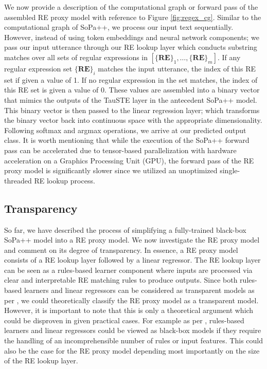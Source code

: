 We now provide a description of the computational graph or forward pass of the
assembled RE proxy model with reference to Figure \ref{fig:regex_cg}. Similar to
the computational graph of SoPa++, we process our input text sequentially.
However, instead of using token embeddings and neural network components; we
pass our input utterance through our RE lookup layer which conducts substring
matches over all sets of regular expressions in $[\{\textbf{RE}\}_1, \ldots,
\{\textbf{RE}\}_m]$. If any regular expression set $\{\textbf{RE}\}_i$ matches
the input utterance, the index of this RE set if given a value of 1. If no
regular expression in the set matches, the index of this RE set is given a value
of 0. These values are assembled into a binary vector that mimics the outputs of
the TauSTE layer in the antecedent SoPa++ model. This binary vector is then
passed to the linear regression layer; which transforms the binary vector back
into continuous space with the appropriate dimensionality. Following softmax and
argmax operations, we arrive at our predicted output class. It is worth
mentioning that while the execution of the SoPa++ forward pass can be
accelerated due to tensor-based parallelization with hardware acceleration on a
Graphics Processing Unit (GPU), the forward pass of the RE proxy model is
significantly slower since we utilized an unoptimized single-threaded RE lookup
process.

\subsection{Transparency}

\label{section:re_transparency}

So far, we have described the process of simplifying a fully-trained black-box
SoPa++ model into a RE proxy model. We now investigate the RE proxy model and
comment on its degree of transparency. In essence, a RE proxy model consists of
a RE lookup layer followed by a linear regressor. The RE lookup layer can be
seen as a rules-based learner component where inputs are processed via clear and
interpretable RE matching rules to produce outputs. Since both rules-based
learners and linear regressors can be considered as transparent models as per
\citet[Page 7, Section 3]{arrieta2020explainable}, we could theoretically
classify the RE proxy model as a transparent model. However, it is important to
note that this is only a theoretical argument which could be disproven in given
practical cases. For example as per \citet[Page 9, Table
2]{arrieta2020explainable}, rules-based learners and linear regressors could be
viewed as black-box models if they require the handling of an incomprehensible
number of rules or input features. This could also be the case for the RE proxy
model depending most importantly on the size of the RE lookup layer.

